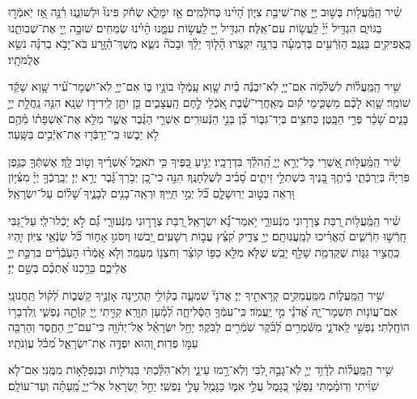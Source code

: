 \documentclass[twoside, openany, parskip=half, 11pt]{book}
\begin{document}
 שִׁ֗יר  הַֽמַּֽ֫עֲל֥וֹת בְּשׁ֣וּב יְ֖יָ אֶת־שִׁיבַ֣ת צִיּ֑וֹן הָ֝יִ֗ינוּ כְּחֹלְֿמִֽים׃ אָ֤ז יִמָּלֵ֢א שְׂחֹ֡ק פִּינוּ֘ וּלְשׁוֹנֵ֢נוּ רִ֫נָּ֥ה אָ֭ז יֹֽאמְֿר֣וּ בַגּוֹיִ֑ם הִגְדִּ֥יל יְ֜יָ֗ לַֽעֲשׂ֥וֹת עִם־אֵֽלֶּה׃ הִגְדִּ֥יל יְ֖יָ לַֽעֲשׂ֣וֹת עִמָּ֑נוּ הָ֜יִ֗ינוּ שְׂמֵחִֽים׃ שׁוּבָ֣ה יְ֖יָ אֶת־שְׁבִותֵ֑נוּ כַּֽאֲפִיקִ֥ים בַּנֶּֽגֶב׃ הַזֹּֽרְֿעִ֥ים בְּדִמְעָ֗ה בְּרִנָּ֥ה יִקְצֹֽרוּ׃ הָ֘ל֤וֹךְ יֵלֵ֨ךְ וּבָכֹה֘ נֹשֵׂ֢א מֶֽשֶׁךְ־הַ֫זָּ֥רַע בֹּֽא־יָבֹ֥א בְרִנָּ֗ה נֹשֵׂ֥א אֲלֻמֹּתָֽיו׃
 
 שִׁ֥יר  הַֽמַּֽעֲל֗וֹת לִשְׁלֹ֫מֹ֥ה אִם־יְיָ֤ לֹֽא־יִבְנֶ֬ה בַ֗יִת שָׁ֤וְא עָֽמְֿל֣וּ בוֹנָ֣יו בּ֑וֹ אִם־יְיָ֥ לֹֽא־יִשְׁמָר־עִ֝֗יר שָׁ֤וְא שָׁקַ֬ד שׁוֹמֵֽר׃ שָׁ֤וְא לָכֶ֨ם מַשְׁכִּ֑ימֵי ק֡וּם מְאַֽחֲרֵי־שֶׁ֗בֶת אֹֽ֭כְֿלֵי לֶ֣חֶם הָֽעֲצָבִ֑ים כֵּ֤ן יִתֵּ֖ן לִֽידִיד֣וֹ שֵׁנָֽא׃ הִנֵּ֤ה נַֽחֲלַ֣ת יְיָ֣ בָּנִ֑ים שָׂ֝כָ֗ר פְּרִ֣י הַבָּֽטֶן׃ כְּחִצִּ֥ים בְּיַד־גִּבּ֑וֹר כֵּ֝֗ן בְּנֵ֣י הַנְּֿעוּרִֽים׃ אַשְׁרֵ֤י הַגֶּ֗בֶר אֲשֶׁ֤ר מִלֵּ֥א אֶת־אַשְׁפָּת֗וֹ מֵ֫הֶ֥ם לֹ֥א יֵב֑שׁוּ כִּֽי־יְדַבְּֿר֖וּ אֶת־אֹֽיְֿבִ֣ים בַּשָּֽׁעַר׃

 שִׁ֗יר  הַֽמַּֽ֫עֲל֥וֹת אַ֭שְׁרֵי כָּל־יְרֵ֣א יְיָ֑ הַֽ֝הֹלֵ֗ךְ בִּדְרָכָֽיו׃ יְגִ֣יעַ כַּ֭פֶּיךָ כִּ֥י תֹאכֵ֑ל אַ֝שְׁרֶ֗יךָ וְט֣וֹב לָֽךְ׃ אֶשְׁתְּֿךָ֤ כְּגֶ֥פֶן פֹּֽרִיָּה֘ בְּיַרְכְּֿתֵ֢י בֵ֫יתֶ֥ךָ בָּ֭נֶיךָ כִּשְׁתִלֵ֣י זֵיתִ֑ים סָ֝בִ֗יב לְשֻׁלְחָנֶֽךָ׃ הִנֵּ֣ה כִי־כֵ֭ן יְבֹ֥רַךְ ֝גָּ֗בֶר יְרֵ֣א יְיָ׃ יְבָֽרֶכְֿךָ֥ יְיָ֗ מִצִּ֫יּ֥וֹן וּ֭רְאֵה בְּט֣וּב יְרֽוּשָׁלָ֑םִ כֹּ֝֗ל יְמֵ֣י חַיֶּֽיךָ׃ וּרְאֵֽה־בָנִ֥ים לְבָנֶ֑יךָ שָׁ֝ל֗וֹם עַל־יִשְׂרָאֵֽל׃

 שִׁ֗יר  הַֽמַּֽ֫עֲל֥וֹת רַ֭בַּת צְרָר֣וּנִי מִנְּֿעוּרַ֑י יֹ֥אמַר־נָ֝֗א יִשְׂרָאֵֽל׃ רַ֭בַּת צְרָר֣וּנִי מִנְּֿעוּרָ֑י גַּ֝֗ם לֹ֣א יָכְֿלוּ־לִֽי׃ עַל־גַּ֭בִּי חָֽרְֿשׁ֣וּ חֹֽרְֿשִׁ֑ים הֶ֝אֱרִ֗יכוּ לְמַֽעֲנִותָֽם׃ יְיָ֥ צַדִּ֑יק קִ֝צֵּ֗ץ עֲב֣וֹת רְשָׁעִֽים׃ יֵ֭בשׁוּ וְיִסֹּגוּ֣ אָח֑וֹר כֹּ֝֗ל שֽׂנְֿאֵ֥י צִיּֽוֹן׃ יִֽ֭הְיוּ כַּֽחֲצִ֣יר גַּגּ֑וֹת שֶׁקַּדְמַ֖ת שָׁלַ֣ף יָבֵֽשׁ׃ שֶׁלֹּ֤א מִלֵּ֖א כַפּ֥וֹ קוֹצֵ֗ר וְחִצְנ֥וֹ מְעַמֵּֽר׃ וְלֹ֤א אָֽמְֿר֨וּ הָעֹֽבְֿרִ֗ים בִּרְכַּ֣ת יְיָ֣ אֲלֵיכֶ֑ם בֵּרַ֥כְנוּ אֶ֝תְכֶ֗ם בְּשֵׁ֣ם יְיָ׃

 שִׁ֥יר  הַֽמַּֽעֲל֑וֹת מִמַּֽעֲמַקִּ֖ים קְרָאתִ֣יךָ יְיָ׃ אֲדֹנָי֘ שִׁמְעָ֢ה בְק֫וֹלִ֥י תִּֽהְיֶ֣ינָה אָזְנֶ֣יךָ קַשֻּׁב֑וֹת לְ֝ק֗וֹל תַּֽחֲנוּנָֽי׃ אִם־עֲוֹנ֥וֹת תִּשְׁמָר־יָ֑הּ אֲ֝דֹנָ֗י מִ֣י יַֽעֲמֹֽד׃ כִּֽי־עִמְּֿךָ֥ הַסְּֿלִיחָ֑ה לְ֝מַ֗עַן תִּוָּרֵֽא׃ קִוִּ֣יתִי יְ֖יָ קִוְּֿתָ֣ה נַפְשִׁ֑י וְֽלִדְבָר֥וֹ הוֹחָֽלְתִּי׃ נַפְשִׁ֣י לַֽאדֹנָ֑י מִשֹּֽֿׁמְרִ֥ים לַ֝בֹּ֗קֶר שֹֽׁמְֿרִ֥ים לַבֹּֽקֶר׃ יַחֵ֥ל יִשְׂרָאֵ֗ל אֶל־יְהֹ֫וָ֥ה כִּי־עִם־יְיָ֥ הַחֶ֑סֶד וְהַרְבֵּ֖ה עִמּ֣וֹ פְדֽוּת׃ וְ֭הֽוּא יִפְדֶּ֣ה אֶת־יִשְׂרָאֵ֑ל מִ֝כֹּ֗ל עֲוֹֽנֹתָֽיו׃

 שִׁ֥יר  הַֽמַּֽעֲל֗וֹת לְדָ֫וִ֥ד יְיָ֤ לֹֽא־גָבַ֣הּ לִ֭בִּי וְלֹֽא־רָ֣מוּ עֵינַ֑י וְלֹֽא־הִלַּ֓כְתִּי בִּגְדֹל֖וֹת וּבְנִפְלָא֣וֹת מִמֶּֽנִּי׃ אִם־לֹ֤א שִׁוִּ֨יתִי וְדֽוֹמַ֗מְתִּי נַפְשִׁ֥֗י כְּ֭גָמֻל עֲלֵ֣י אִמּ֑וֹ כַּגָּמֻ֖ל עָלַ֣י נַפְשִֽׁי׃ יַחֵ֣ל יִ֭שְׂרָאֵל אֶל־יְיָ֑ מֵֽ֝עַתָּ֗ה וְעַד־עוֹלָֽם׃
\end{document}
